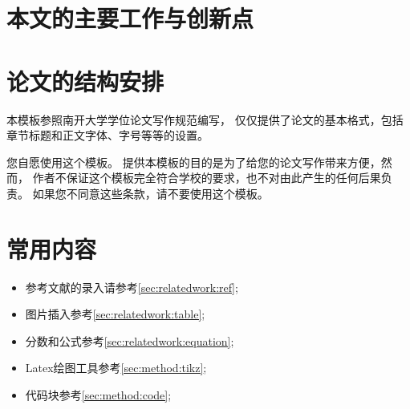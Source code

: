 \section{本文的主要工作与创新点}

\section{论文的结构安排}

本模板参照南开大学学位论文写作规范编写，
仅仅提供了论文的基本格式，包括章节标题和正文字体、字号等等的设置。



您自愿使用这个模板。
提供本模板的目的是为了给您的论文写作带来方便，然而，
作者不保证这个模板完全符合学校的要求，也不对由此产生的任何后果负责。
如果您不同意这些条款，请不要使用这个模板。


\section{常用内容}

\begin{itemize}
	\item 参考文献的录入请参考\ref{sec:relatedwork:ref};
	\item 图片插入参考\ref{sec:relatedwork:table};
	\item 分数和公式参考\ref{sec:relatedwork:equation};
	\item Latex绘图工具参考\ref{sec:method:tikz};
	\item 代码块参考\ref{sec:method:code};
\end{itemize}